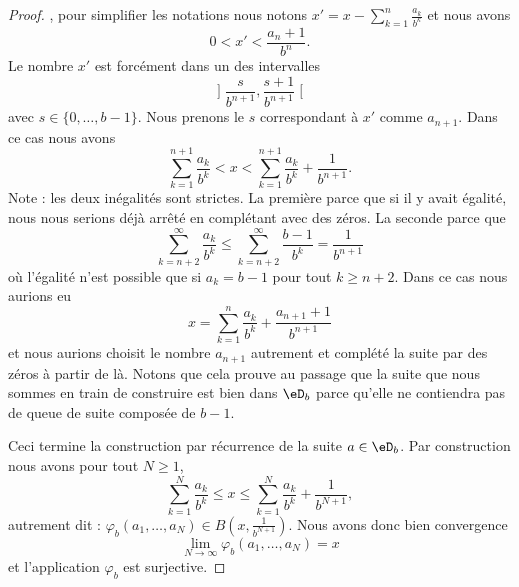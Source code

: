 \begin{proof}
        , pour simplifier les notations nous notons \( x'=x-\sum_{k=1}^{n}\frac{ a_k }{ b^k }\) et nous avons
        \begin{equation}
            0<x'<\frac{ a_n+1 }{ b^n }.
        \end{equation}
        Le nombre \( x'\) est forcément dans un des intervalles
        \begin{equation}
                \mathopen] \frac{ s }{ b^{n+1} } , \frac{ s+1 }{ b^{n+1} } \mathclose[
        \end{equation}
        avec \( s\in\{ 0,\ldots, b-1 \}\). Nous prenons le \( s\) correspondant à \( x'\) comme \( a_{n+1}\). Dans ce cas nous avons
        \begin{equation}
            \sum_{k=1}^{n+1}\frac{ a_k }{ b^k }< x<\sum_{k=1}^{n+1}\frac{ a_k }{ b^k }+\frac{1}{ b^{n+1} }.
        \end{equation}
        Note : les deux inégalités sont strictes. La première parce que si il y avait égalité, nous nous serions déjà arrêté en complétant avec des zéros. La seconde parce que 
        \begin{equation}
            \sum_{k=n+2}^{\infty}\frac{ a_k }{ b^k }\leq \sum_{k=n+2}^{\infty}\frac{ b-1 }{ b^k }=\frac{1}{ b^{n+1} }
        \end{equation}
        où l'égalité n'est possible que si \( a_k=b-1\) pour tout \( k\geq n+2\). Dans ce cas nous aurions eu
        \begin{equation}
            x=\sum_{k=1}^{n}\frac{ a_k }{ b^k }+\frac{ a_{n+1}+1 }{ b^{n+1} }
        \end{equation}
        et nous aurions choisit le nombre \( a_{n+1}\) autrement et complété la suite par des zéros à partir de là. Notons que cela prouve au passage que la suite que nous sommes en train de construire est bien dans \( \eD_b\) parce qu'elle ne contiendra pas de queue de suite composée de \( b-1\).

        Ceci termine la construction par récurrence de la suite \( a\in \eD_b\). Par construction nous avons pour tout \( N\geq 1\),
        \begin{equation}
            \sum_{k=1}^N\frac{ a_k }{ b^k }\leq x\leq \sum_{k=1}^N\frac{ a_k }{ b^k }+\frac{1}{ b^{N+1} }, 
        \end{equation}
        autrement dit : \( \varphi_b(a_1,\ldots, a_N)\in B(x,\frac{1}{ b^{N+1} })\). Nous avons donc bien convergence
        \begin{equation}
            \lim_{N\to \infty} \varphi_b(a_1,\ldots, a_N)=x
        \end{equation}
        et l'application \( \varphi_b\) est surjective.
\end{proof}

